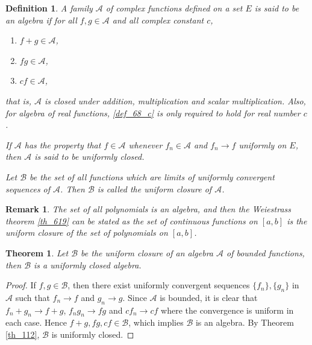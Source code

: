 \documentclass[10pt]{book}
\newtheorem{definition}{Definition}[chapter]
\newtheorem{theorem}{Theorem}[chapter]
\newtheorem{remark}{Remark}[chapter]
\theoremstyle{definition}
\numberwithin{equation}{chapter}
\begin{document}
\medskip

\begin{definition}\label{def_68}
A family $\mathscr{A}$ of complex functions defined on a set $E$ is said to be an algebra if for all $f, g \in \mathscr{A}$ and all complex constant $c$,
\begin{enumerate}[label=(\alph*)]
    \item $f + g \in \mathscr{A}$, \label{def_68_a}
    
    \item $fg \in \mathscr{A}$, \label{def_68_b}
    
    \item $cf \in \mathscr{A}$, \label{def_68_c}
\end{enumerate}
that is, $\mathscr{A}$ is closed under addition, multiplication and scalar multiplication. Also, for algebra of real functions, \ref{def_68_c} is only required to hold for real number $c$.

If $\mathscr{A}$ has the property that $f \in \mathscr{A}$ whenever $f_n \in \mathscr{A}$ and $f_n \to f$ uniformly on $E$, then $\mathscr{A}$ is said to be uniformly closed.

Let $\mathscr{B}$ be the set of all functions which are limits of uniformly convergent sequences of $\mathscr{A}$. Then $\mathscr{B}$ is called the uniform closure of $\mathscr{A}$.
\end{definition}

\medskip

\begin{remark}
The set of all polynomials is an algebra, and then the Weiestrass theorem \ref{th_619} can be stated as the set of continuous functions on $[a,b]$ is the uniform closure of the set of polynomials on $[a,b]$.
\end{remark}

\medskip

\begin{theorem}
Let $\mathscr{B}$ be the uniform closure of an algebra $\mathscr{A}$ of bounded functions, then $\mathscr{B}$ is a uniformly closed algebra.
\end{theorem}
\begin{proof}
If $f,g \in \mathscr{B}$, then there exist uniformly convergent sequences $\{f_n\}, \{g_n\}$ in $\mathscr{A}$ such that $f_n \to f$ and $g_n \to g$. Since $\mathscr{A}$ is bounded, it is clear that $f_n + g_n \to f + g$, $f_ng_n \to fg$ and $cf_n \to cf$ where the convergence is uniform in each case. Hence $f + g, fg, cf \in \mathscr{B}$, which implies $\mathscr{B}$ is an algebra. By Theorem \ref{th_112}, $\mathscr{B}$ is uniformly closed.
\end{proof}
\end{document}
